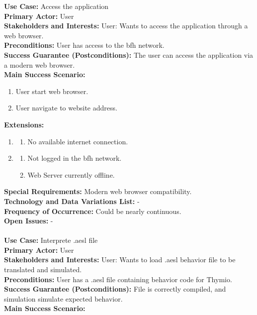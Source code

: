 \documentclass{scrbook}
\begin{document}
\textbf{Use Case: }Access the application \\
\textbf{Primary Actor: }User \\
\textbf{Stakeholders and Interests: }User: Wants to access the application through a web browser. \\
\textbf{Preconditions: }User has access to the bfh network. \\
\textbf{Success Guarantee (Postconditions): }The user can access the application via a modern web browser. \\
\textbf{Main Success Scenario: } 
\begin{enumerate}
  \item User start web browser.
  \item User navigate to website address.
\end{enumerate}
\textbf{Extensions: } 
\begin{enumerate}
  \item 
  \begin{enumerate}
    \item No available internet connection.
  \end{enumerate}
  \item 
  \begin{enumerate}
    \item Not logged in the bfh network.
    \item Web Server currently offline.
  \end{enumerate}
\end{enumerate}
\textbf{Special Requirements: }Modern web browser compatibility. \\
\textbf{Technology and Data Variations List: }- \\
\textbf{Frequency of Occurrence: }Could be nearly continuous.\\
\textbf{Open Issues: }- \\
\\
\textbf{Use Case: }Interprete .aesl file \\
\textbf{Primary Actor: }User \\
\textbf{Stakeholders and Interests: }User: Wants to load .aesl behavior file to be translated and simulated. \\
\textbf{Preconditions: }User has a .aesl file containing behavior code for Thymio. \\
\textbf{Success Guarantee (Postconditions): }File is correctly compiled, and simulation simulate expected behavior. \\
\textbf{Main Success Scenario: }
\end{document}
